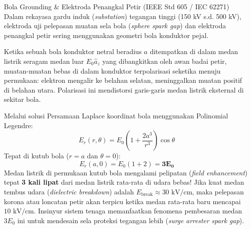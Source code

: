 \documentclass[11pt,a4paper]{article}
\theoremstyle{definition}
\begin{document}
\begin{casebox}{Bola Grounding \& Elektroda Penangkal Petir (IEEE Std 605 / IEC 62271)}
Dalam rekayasa gardu induk (\textit{substation}) tegangan tinggi (150 kV s.d. 500 kV), elektroda uji pelepasan muatan sela bola (\textit{sphere spark gap}) dan elektroda penangkal petir sering menggunakan geometri bola konduktor pejal.

Ketika sebuah bola konduktor netral beradius $a$ ditempatkan di dalam medan listrik seragam medan luar $E_0 \hat{a}_z$ yang dibangkitkan oleh awan badai petir, muatan-muatan bebas di dalam konduktor terpolarisasi seketika menuju permukaan: elektron mengalir ke belahan selatan, meninggalkan muatan positif di belahan utara. Polarisasi ini mendistorsi garis-garis medan listrik eksternal di sekitar bola.

Melalui solusi Persamaan Laplace koordinat bola menggunakan Polinomial Legendre:
\begin{equation}
    E_r(r, \theta) = E_0 \left( 1 + \frac{2a^3}{r^3} \right) \cos\theta
\end{equation}
Tepat di kutub bola ($r = a$ dan $\theta = 0$):
\begin{equation}
    E_r(a, 0) = E_0 (1 + 2) = \mathbf{3 E_0}
\end{equation}
Medan listrik di permukaan kutub bola mengalami pelipatan (\textit{field enhancement}) tepat \textbf{3 kali lipat} dari medan listrik rata-rata di udara bebas! Jika kuat medan tembus udara (\textit{dielectric breakdown}) adalah $E_{\text{break}} \approx 30\text{ kV/cm}$, maka pelepasan korona atau loncatan petir akan terpicu ketika medan rata-rata baru mencapai $10\text{ kV/cm}$. Insinyur sistem tenaga memanfaatkan fenomena pembesaran medan $3E_0$ ini untuk mendesain sela proteksi tegangan lebih (\textit{surge arrester spark gap}).
\end{casebox}
\end{document}
